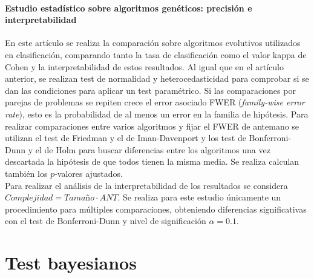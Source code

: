 	\paragraph{Estudio estadístico sobre algoritmos genéticos: precisión e interpretabilidad} \cite{GARCIA08} En este artículo se realiza la comparación sobre algoritmos evolutivos utilizados en clasificación, comparando tanto la tasa de clasificación como el valor kappa de Cohen y la interpretabilidad de estos resultados. Al igual que en el artículo anterior, se realizan test de normalidad y heterocedasticidad para comprobar si se dan las condiciones para aplicar un test paramétrico. Si las comparaciones por parejas de problemas se repiten crece el error asociado FWER (\textit{family-wise error rate}), esto es la probabilidad de al menos un error en la familia de hipótesis. Para realizar comparaciones entre varios algoritmos y fijar el FWER de antemano se utilizan el test de Friedman y el de Iman-Davenport y los test de Bonferroni-Dunn y el de Holm para buscar diferencias entre los algoritmos una vez descartada la hipótesis de que todos tienen la misma media. Se realiza calculan también los $p$-valores ajustados.\\
	Para realizar el análisis de la interpretabilidad de los resultados se considera $\textit{Complejidad} = \textit{Tamaño} \cdot ANT$. Se realiza para este estudio únicamente un procedimiento para múltiples comparaciones, obteniendo diferencias significativas con el test de Bonferroni-Dunn y nivel de significación $\alpha=0.1$.
	


\section{Test bayesianos}	
